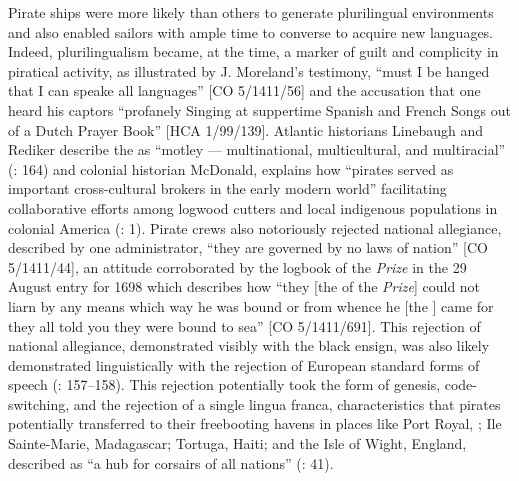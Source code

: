 Pirate ships were more likely than others to generate plurilingual environments and also enabled sailors with ample time to converse to acquire new languages. Indeed, plurilingualism became, at the time, a marker of guilt and complicity in piratical activity, as illustrated by J. Moreland’s testimony, “must I be hanged that I can speake all languages” [CO 5/1411/56] and the accusation that one  heard his captors “profanely Singing at suppertime Spanish and French Songs out of a Dutch Prayer Book” [HCA 1/99/139]. Atlantic historians Linebaugh and Rediker describe the  as “motley — multinational, multicultural, and multiracial” (\citeyear*{LinebaughRediker2000}: 164) and colonial historian McDonald, explains how “pirates served as important cross-cultural brokers in the early modern world” facilitating collaborative efforts among logwood cutters and local indigenous populations in colonial America (\citeyear*{McDonald2016}: 1).  Pirate crews also notoriously rejected national allegiance, described by one administrator, “they are governed by no laws of nation” [CO 5/1411/44], an attitude corroborated by the logbook of the \textit{ Prize} in the 29 August entry for 1698 which describes how “they [the  of the \textit{ Prize}] could not liarn by any means which way he was bound or from whence he [the ] came for they all told you they were bound to sea” [CO 5/1411/691]. This rejection of national allegiance, demonstrated visibly with the black ensign, was also likely demonstrated linguistically with the rejection of European standard forms of speech (\citealt{Delgado2013}: 157–158). This rejection potentially took the form of  genesis, code-switching, and the rejection of a single lingua franca, characteristics that pirates potentially transferred to their freebooting havens in places like Port Royal, ; Ile Sainte-Marie, Madagascar; Tortuga, Haiti; and the Isle of Wight, England, described as “a hub for corsairs of all nations” (\citealt{Bicheno2012}: 41). 

